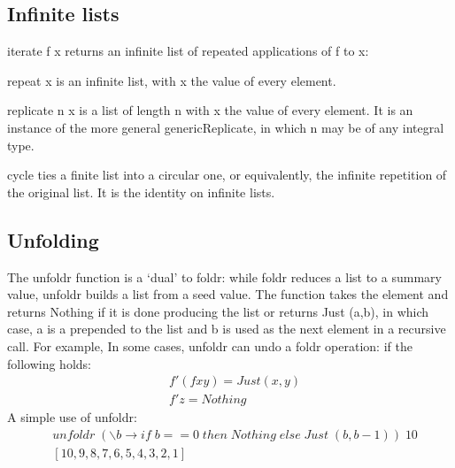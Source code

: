 \subsection{Infinite lists}
iterate f x returns an infinite list of repeated applications of f to x:

repeat x is an infinite list, with x the value of every element.

replicate n x is a list of length n with x the value of every element. It is an instance of the more general genericReplicate, in which n may be of any integral type.

cycle ties a finite list into a circular one, or equivalently, the infinite repetition of the original list. It is the identity on infinite lists.

\subsection{Unfolding}
The unfoldr function is a `dual' to foldr: while foldr reduces a list to a summary value, unfoldr builds a list from a seed value. The function takes the element and returns Nothing if it is done producing the list or returns Just (a,b), in which case, a is a prepended to the list and b is used as the next element in a recursive call. For example,
In some cases, unfoldr can undo a foldr operation:
if the following holds:
\begin{align*}
	&f' (f x y) = Just (x,y)\\
	&f' z       = Nothing
\end{align*}
A simple use of unfoldr:
\begin{align*}
	&unfoldr\; (\backslash b \rightarrow if\; b == 0\; then\; Nothing\; else\; Just\; (b, b-1))\; 10\\
	&[10,9,8,7,6,5,4,3,2,1]
\end{align*}